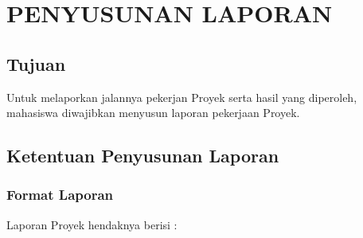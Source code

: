 \chapter{PENYUSUNAN LAPORAN}
\section{Tujuan}
Untuk	 melaporkan	 jalannya	 pekerjan	 Proyek	 serta	 hasil	 yang	 diperoleh,	 mahasiswa	diwajibkan	menyusun	laporan	pekerjaan	Proyek.

\section{Ketentuan Penyusunan Laporan}
\subsection{Format Laporan}
Laporan	Proyek	hendaknya	berisi	:

